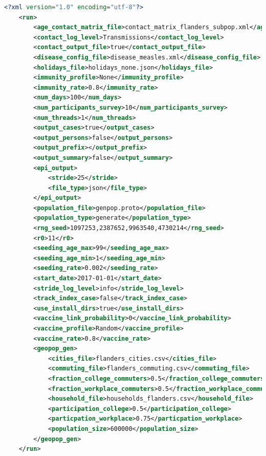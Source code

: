\begin{center}
	\begin{lstlisting}[language=XML,caption=An example of the configuration file with workplace size distribution.]
	<?xml version="1.0" encoding="utf-8"?>
	<run>
		<age_contact_matrix_file>contact_matrix_flanders_subpop.xml</age_contact_matrix_file>
		<contact_log_level>Transmissions</contact_log_level>
		<contact_output_file>true</contact_output_file>
		<disease_config_file>disease_measles.xml</disease_config_file>
		<holidays_file>holidays_none.json</holidays_file>
		<immunity_profile>None</immunity_profile>
		<immunity_rate>0.8</immunity_rate>
		<num_days>100</num_days>
		<num_participants_survey>10</num_participants_survey>
		<num_threads>1</num_threads>
		<output_cases>true</output_cases>
		<output_persons>false</output_persons>
		<output_prefix></output_prefix>
		<output_summary>false</output_summary>
		<epi_output>
		    <stride>25</stride>
		    <file_type>json</file_type>
		</epi_output>
		<population_file>genpop.proto</population_file>
		<population_type>generate</population_type>
		<rng_seed>1097253,2387652,9963540,4730214</rng_seed>
		<r0>11</r0>
		<seeding_age_max>99</seeding_age_max>
		<seeding_age_min>1</seeding_age_min>
		<seeding_rate>0.002</seeding_rate>
		<start_date>2017-01-01</start_date>
		<stride_log_level>info</stride_log_level>
		<track_index_case>false</track_index_case>
		<use_install_dirs>true</use_install_dirs>
		<vaccine_link_probability>0</vaccine_link_probability>
		<vaccine_profile>Random</vaccine_profile>
		<vaccine_rate>0.8</vaccine_rate>
		<geopop_gen>
		    <cities_file>flanders_cities.csv</cities_file>
			<commuting_file>flanders_commuting.csv</commuting_file>
			<fraction_college_commuters>0.5</fraction_college_commuters>
			<fraction_workplace_commuters>0.5</fraction_workplace_commuters>
			<household_file>households_flanders.csv</household_file>
			<participation_college>0.5</participation_college>
			<particpation_workplace>0.75</particpation_workplace>
			<population_size>600000</population_size>
		</geopop_gen>
	</run>
	\end{lstlisting}
\end{center}



